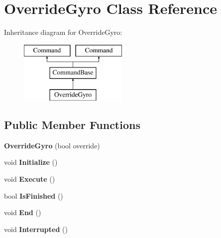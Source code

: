 \hypertarget{class_override_gyro}{}\section{Override\+Gyro Class Reference}
\label{class_override_gyro}
Inheritance diagram for Override\+Gyro\+:\begin{figure}[H]
\begin{center}
\leavevmode
\includegraphics[height=3.000000cm]{class_override_gyro}
\end{center}
\end{figure}
\subsection*{Public Member Functions}
\begin{DoxyCompactItemize}
\item 
\hypertarget{class_override_gyro_ac78f181f557774ea3b77c179fb01e9b5}{}{\bfseries Override\+Gyro} (bool override)\label{class_override_gyro_ac78f181f557774ea3b77c179fb01e9b5}

\item 
\hypertarget{class_override_gyro_a9d1af5c68f2c1fdfebd7bd90f1a4f3ae}{}void {\bfseries Initialize} ()\label{class_override_gyro_a9d1af5c68f2c1fdfebd7bd90f1a4f3ae}

\item 
\hypertarget{class_override_gyro_a9fa5bb1db7ef8eae36207f547674ae5b}{}void {\bfseries Execute} ()\label{class_override_gyro_a9fa5bb1db7ef8eae36207f547674ae5b}

\item 
\hypertarget{class_override_gyro_a44fe43c8215245cd31c569e8953f1ed3}{}bool {\bfseries Is\+Finished} ()\label{class_override_gyro_a44fe43c8215245cd31c569e8953f1ed3}

\item 
\hypertarget{class_override_gyro_a0d6e3c1f8476ef339b12f2d44b5450f4}{}void {\bfseries End} ()\label{class_override_gyro_a0d6e3c1f8476ef339b12f2d44b5450f4}

\item 
\hypertarget{class_override_gyro_aaca558864ff872cdcebb9e5f82511bbb}{}void {\bfseries Interrupted} ()\label{class_override_gyro_aaca558864ff872cdcebb9e5f82511bbb}

\end{DoxyCompactItemize}
